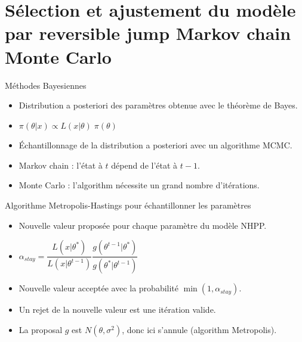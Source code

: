 \documentclass[aspectratio=169]{beamer}
\begin{document}
\section{Sélection et ajustement du modèle par reversible jump Markov chain Monte Carlo}

\begin{frame}{Méthodes Bayesiennes}
	\begin{itemize}
	\setlength{\itemsep}{17pt}
	\item Distribution a posteriori des paramètres obtenue avec le théorème de Bayes.
	\item $\pi(\theta|x) \propto L(x|\theta) \; \pi(\theta)$
	\item Échantillonnage de la distribution a posteriori avec un algorithme MCMC.
	\item Markov chain : l'état à $t$ dépend de l'état à $t-1$.
	\item Monte Carlo : l'algorithm nécessite un grand nombre d'itérations.
	\end{itemize}
\end{frame}


\begin{frame}{Algorithme Metropolis-Hastings pour échantillonner les paramètres}
	\begin{itemize}
	\setlength{\itemsep}{17pt}
	\item Nouvelle valeur proposée pour chaque paramètre du modèle NHPP.
	\item $\alpha_{stay} = \dfrac{L(x|\theta^*)}{L(x|\theta^{t-1})} \dfrac{g(\theta^{t-1}|\theta^*)}{g(\theta^*|\theta^{t-1})}$
	\item Nouvelle valeur acceptée avec la probabilité $\min(1, \alpha_{stay})$.
	\item Un rejet de la nouvelle valeur est une itération valide.
	\item La proposal $g$ est $N(\theta, \sigma^2)$, donc ici s'annule (algorithm Metropolis).
	\end{itemize}
\end{frame}
\end{document}
